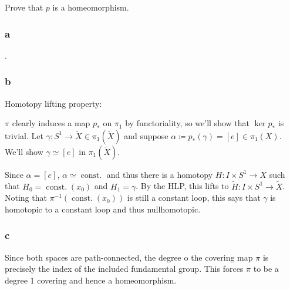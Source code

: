 Prove that \(p\) is a homeomorphism.


\begin{solution}

\hfill

\begin{concept}

\hfill

\end{concept}

\hypertarget{a-13}{%
\subsubsection{a}\label{a-13}}

.

\hypertarget{b-13}{%
\subsubsection{b}\label{b-13}}

Homotopy lifting property:

\begin{center}
\end{center}

\(\pi\) clearly induces a map \(p_*\) on \(\pi_1\) by functoriality, so
we'll show that \(\ker p_*\) is trivial. Let
\(\gamma: S^1 \to \tilde X \in \pi_1(\tilde X)\) and suppose
\(\alpha \coloneqq p_*(\gamma) = [e] \in \pi_1(X)\). We'll show
\(\gamma \simeq[e]\) in \(\pi_1(\tilde X)\).

Since \(\alpha = [e]\), \(\alpha \simeq{\operatorname{const.}}\) and
thus there is a homotopy \(H: I\times S^1 \to X\) such that
\(H_0 = {\operatorname{const.}}(x_0)\) and \(H_1 = \gamma\). By the HLP,
this lifts to \(\tilde H: I\times S^1 \to \tilde X\). Noting that
\(\pi^{-1}({\operatorname{const.}}(x_0))\) is still a constant loop,
this says that \(\gamma\) is homotopic to a constant loop and thus
nullhomotopic.

\hypertarget{c-2}{%
\subsubsection{c}\label{c-2}}

Since both spaces are path-connected, the degree o the covering map
\(\pi\) is precisely the index of the included fundamental group. This
forces \(\pi\) to be a degree 1 covering and hence a homeomorphism.

\end{solution}

